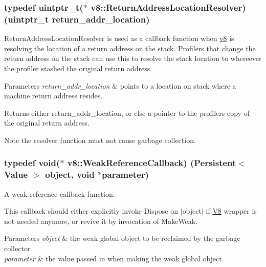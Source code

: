 \subsubsection[{Return\+Address\+Location\+Resolver}]{\setlength{\rightskip}{0pt plus 5cm}typedef uintptr\+\_\+t($\ast$ v8\+::\+Return\+Address\+Location\+Resolver) (uintptr\+\_\+t return\+\_\+addr\+\_\+location)}\label{namespacev8_a8ce54c75241be41ff6a25e9944eefd2a}
Return\+Address\+Location\+Resolver is used as a callback function when \hyperlink{namespacev8}{v8} is resolving the location of a return address on the stack. Profilers that change the return address on the stack can use this to resolve the stack location to whereever the profiler stashed the original return address.


\begin{DoxyParams}{Parameters}
{\em return\+\_\+addr\+\_\+location} & points to a location on stack where a machine return address resides. \\
\hline
\end{DoxyParams}
\begin{DoxyReturn}{Returns}
either return\+\_\+addr\+\_\+location, or else a pointer to the profiler\textquotesingle{}s copy of the original return address.
\end{DoxyReturn}
\begin{DoxyNote}{Note}
the resolver function must not cause garbage collection. 
\end{DoxyNote}
\hypertarget{namespacev8_a4d5db775dbc002b23f1b55ec7ce80ea5}{}
\subsubsection[{Weak\+Reference\+Callback}]{\setlength{\rightskip}{0pt plus 5cm}typedef void($\ast$ v8\+::\+Weak\+Reference\+Callback) ({\bf Persistent}$<$ {\bf Value} $>$ object, void $\ast$parameter)}\label{namespacev8_a4d5db775dbc002b23f1b55ec7ce80ea5}
A weak reference callback function.

This callback should either explicitly invoke Dispose on $\vert$object$\vert$ if \hyperlink{classv8_1_1_v8}{V8} wrapper is not needed anymore, or \textquotesingle{}revive\textquotesingle{} it by invocation of Make\+Weak.


\begin{DoxyParams}{Parameters}
{\em object} & the weak global object to be reclaimed by the garbage collector \\
\hline
{\em parameter} & the value passed in when making the weak global object \\
\hline
\end{DoxyParams}


